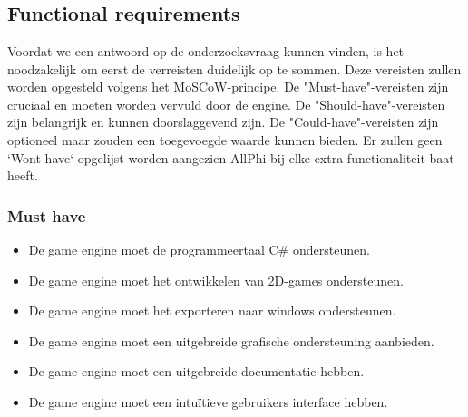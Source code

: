 
\chapter{}%
\label{ch:requirements-analyse}


\section{Functional requirements}
Voordat we een antwoord op de onderzoeksvraag kunnen vinden, is het noodzakelijk om eerst de verreisten duidelijk op te sommen. Deze vereisten zullen worden opgesteld volgens het MoSCoW-principe. De "Must-have"-vereisten zijn cruciaal en moeten worden vervuld door de engine. De "Should-have"-vereisten zijn belangrijk en kunnen doorslaggevend zijn. De "Could-have"-vereisten zijn optioneel maar zouden een toegevoegde waarde kunnen bieden. Er zullen geen `Wont-have` opgelijst worden aangezien AllPhi bij elke extra functionaliteit baat heeft.
\subsection{Must have}
\begin{itemize}
    \item De game engine moet de programmeertaal C\# ondersteunen.
    \item De game engine moet het ontwikkelen van 2D-games ondersteunen.
    \item De game engine moet het exporteren naar windows ondersteunen.
    \item De game engine moet een uitgebreide grafische ondersteuning aanbieden.
    \item De game engine moet een uitgebreide documentatie hebben.
    \item De game engine moet een intuïtieve gebruikers interface hebben.
\end{itemize}

